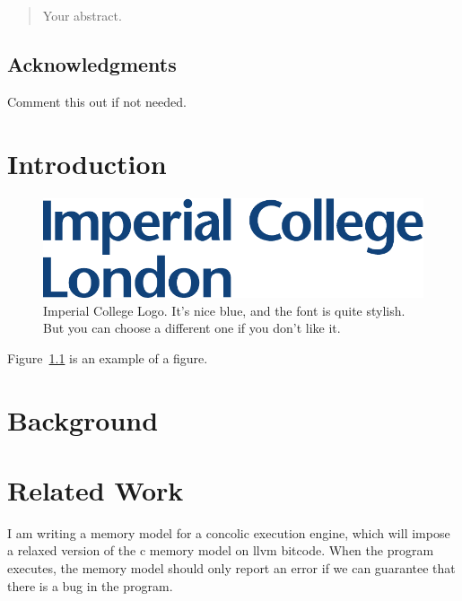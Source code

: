 \documentclass[12pt,twoside]{report}
\begin{document}



\clearpage{\pagestyle{empty}\cleardoublepage}
\setcounter{page}{1}
\pagestyle{fancy}

\begin{abstract}
Your abstract.
\end{abstract}

\cleardoublepage
\section*{Acknowledgments}
Comment this out if not needed.

\clearpage{\pagestyle{empty}\cleardoublepage}

\tableofcontents 


\clearpage{\pagestyle{empty}\cleardoublepage}
\setcounter{page}{1}
\fancyhead[LE,RO]{\slshape \rightmark}
\fancyhead[LO,RE]{\slshape \leftmark}

\chapter{Introduction}

\begin{figure}[tb]
\centering
\includegraphics[width = 0.4\hsize]{./figures/imperial}
\caption{Imperial College Logo. It's nice blue, and the font is quite stylish. But you can choose a different one if you don't like it.}
\label{fig:logo}
\end{figure}

Figure~\ref{fig:logo} is an example of a figure. 

\chapter{Background}
\chapter{Related Work}

I am writing a memory model for a concolic execution engine, which will impose a relaxed version of the c memory model on llvm bitcode. When the program executes, the memory model should only report an error if we can guarantee that there is a bug in the program.
\end{document}
